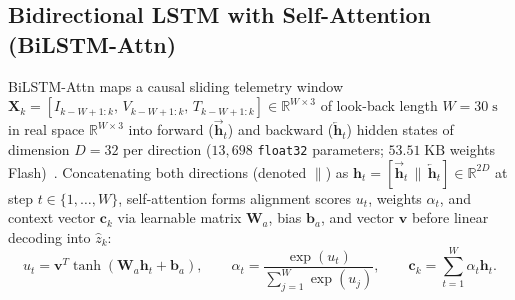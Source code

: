 \documentclass[10pt,a4paper]{article}
\begin{document}
\subsection{Bidirectional LSTM with Self-Attention (BiLSTM-Attn)}
BiLSTM-Attn maps a causal sliding telemetry window $\mathbf{X}_k = [I_{k-W+1:k},\, V_{k-W+1:k},\, T_{k-W+1:k}] \in \mathbb{R}^{W \times 3}$ of look-back length $W = 30\;\mathrm{s}$ in real space $\mathbb{R}^{W \times 3}$ into forward ($\overrightarrow{\mathbf{h}}_t$) and backward ($\overleftarrow{\mathbf{h}}_t$) hidden states of dimension $D = 32$ per direction ($13,698$ \texttt{float32} parameters; $53.51\;\mathrm{KB}$ weights Flash)~\cite{Song2019bilstm,Vaswani2017attention}. Concatenating both directions (denoted $\|$) as $\mathbf{h}_t = [\overrightarrow{\mathbf{h}}_t \,\|\, \overleftarrow{\mathbf{h}}_t] \in \mathbb{R}^{2 D}$ at step $t \in \{1,\dots,W\}$, self-attention forms alignment scores $u_t$, weights $\alpha_t$, and context vector $\mathbf{c}_k$ via learnable matrix $\mathbf{W}_a$, bias $\mathbf{b}_a$, and vector $\mathbf{v}$ before linear decoding into $\hat{z}_k$:
\begin{equation}\label{eqn:attn_context}
u_t = \mathbf{v}^T \tanh(\mathbf{W}_a \mathbf{h}_t + \mathbf{b}_a), \qquad
\alpha_t = \frac{\exp(u_t)}{\sum_{j=1}^W \exp(u_j)}, \qquad
\mathbf{c}_k = \sum_{t=1}^W \alpha_t \mathbf{h}_t.
\end{equation}
\end{document}
